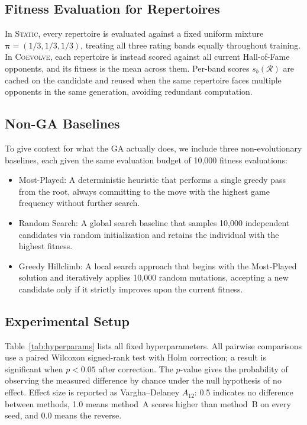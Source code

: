 \documentclass[conference]{IEEEtran}
\begin{document}
\subsection{Fitness Evaluation for Repertoires}

In {\scshape Static}, every repertoire is evaluated against a fixed uniform
mixture $\boldsymbol{\pi} = (1/3, 1/3, 1/3)$, treating all three rating
bands equally throughout training. In {\scshape Coevolve}, each repertoire
is instead scored against all current Hall-of-Fame opponents, and its
fitness is the mean across them. Per-band scores $s_b(\mathcal{R})$ are
cached on the candidate and reused when the same repertoire faces multiple
opponents in the same generation, avoiding redundant computation.

\subsection{Non-GA Baselines}

To give context for what the GA actually does, we include three
non-evolutionary baselines, each given the same evaluation budget of 10,000 fitness evaluations:
\begin{itemize}
\item Most-Played: A deterministic heuristic that performs a single greedy pass from the root, always committing to the move with the highest game frequency without further search.
\item Random Search: A global search baseline that samples 10,000 independent candidates via random initialization and retains the individual with the highest fitness.
\item Greedy Hillclimb: A local search approach that begins with the Most-Played solution and iteratively applies 10,000 random mutations, accepting a new candidate only if it strictly improves upon the current fitness.
\end{itemize}

\subsection{Experimental Setup}
\label{sec:setup}

Table~\ref{tab:hyperparams} lists all fixed hyperparameters. All pairwise comparisons use a
paired Wilcoxon signed-rank test with Holm correction; a result is significant when $p < 0.05$
after correction. The $p$-value gives the probability of observing the measured difference by
chance under the null hypothesis of no effect. Effect size is reported as Vargha--Delaney
$A_{12}$: 0.5 indicates no difference between methods, 1.0 means method~A scores higher than
method~B on every seed, and 0.0 means the reverse.
\end{document}
